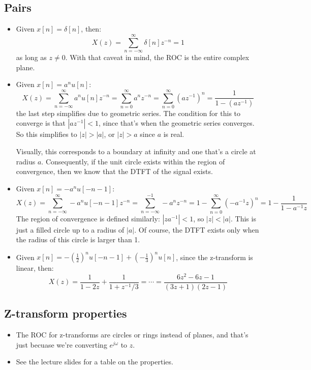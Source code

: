 \subsection{Pairs}
\begin{itemize}
	\item Given \( x[n] = \delta[n] \), then:
		\[
			X(z) = \sum_{n=-\infty}^{\infty} \delta[n] z^{-n} = 1
		\] 
		as long as \( z \neq 0 \). With that caveat in mind, the ROC is the entire complex plane. 
	\item Given \( x[n] = a^{n}u[n] \):
		\[
			X(z) = \sum_{n=-\infty}^{\infty} a^{n}u[n] z^{-n} = \sum_{n=0}^{\infty} a^{n}z^{-n}
			= \sum_{n=0}^{\infty} (az^{-1})^{n} = \frac{1}{1 - (az^{-1})}
		\] 
		the last step simplifies due to geometric series. The condition for this to converge is 
		that \( |az^{-1}| < 1 \), since that's when the geometric series converges. So this simplifies 
		to \( |z| > |a| \), or \( |z| > a \) since \( a \) is real. 

		Visually, this corresponds to a boundary at infinity and one that's a circle at radius \( a \). Consequently, 
		if the unit circle exists within the region of convergence, then we know that the DTFT of the signal 
		exists. 
	\item Given \( x[n] = -a^{n}u[-n - 1] \):
		\[
			X(z) = \sum_{n=-\infty}^{\infty} -a^{n}u[-n - 1] z^{-n} = \sum_{n=-\infty}^{-1} -a^{n}z^{-n}
			= 1 - \sum_{n=0}^{\infty} (-a^{-1}z)^{n}  = 1 - \frac{1}{1 - a^{-1}z}
		\] 
		The region of convergence is defined similarly: \( |za^{-1}| < 1 \), so \( |z| < |a| \). This is just a
		filled circle up to a radius of \( |a| \). Of course, the DTFT exists only when the radius of this circle 
		is larger than 1. 
	\item Given  \( x[n] = -\left( \frac{1}{2} \right)^{n}u[-n - 1] + \left( -\frac{1}{3} \right)^{n}u[n] \), 
		since the z-transform is linear, then:
		\[
		X(z) = \frac{1}{1 - 2z } + \frac{1}{1 + z^{-1} / 3} = \cdots = \frac{6z^2 - 6z - 1}{(3z + 1)(2z - 1)}
		\] 
\end{itemize}
\subsection{Z-transform properties}
\begin{itemize}
	\item The ROC for z-transforms are circles or rings instead of planes, and that's just becuase we're 
		converting \( e^{j \omega} \) to \( z \). 
	\item See the lecture slides for a table on the properties. 
\end{itemize}
